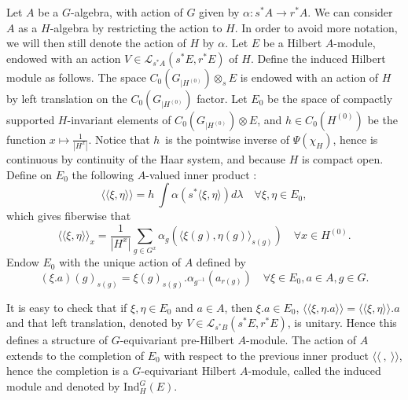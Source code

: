 Let $A$ be a $G$-algebra, with action of $G$ given by $\alpha : s^*A \rightarrow r^* A$. We can consider $A$ as a $H$-algebra by restricting the action to $H$. In order to avoid more notation, we will then still denote the action of $H$ by $\alpha$. Let $E$ be a Hilbert $A$-module, endowed with an action $V\in\mathcal L_{s^*A}(s^*E,r^*E)$ of $H$. Define the induced Hilbert module as follows. The space $C_0(G_{|H^{(0)}} )\otimes_s E$ is endowed with an action of $H$ by left translation on the $C_0(G_{|H^{(0)}})$ factor.  Let $E_0$ be the space of compactly supported $H$-invariant elements of $C_0(G_{|H^{(0)}})\otimes E$, and $h\in C_0(H^{(0)})$ be the function $x\mapsto \frac{1}{|H^x|}$. Notice that $h$\ is the pointwise inverse of $\Psi (\chi_H)$, hence is continuous by continuity of the Haar system, and because $H$ is compact open. Define on $E_0$ the following $A$-valued inner product :
\[\langle\langle \xi, \eta\rangle\rangle = h\ \int \alpha(s^*\langle \xi,\eta\rangle)d\lambda \quad \forall \xi,\eta\in E_0, \]
which gives fiberwise that 
\[\langle\langle \xi, \eta\rangle\rangle_x = \frac{1}{|H^x|}\sum_{g\in G^x} \alpha_g(\langle \xi (g),\eta (g)\rangle_{s(g)})\quad \forall x\in H^{(0)}.\]
Endow $E_0$ with the unique action of $A$ defined by 
\[(\xi .a)(g)_{s(g)} = \xi (g)_{s(g)}.\alpha_{g^{-1}}(a_{r(g)}) \quad \forall \xi \in E_0, a\in A,g\in G.\]


It is easy to check that if $\xi,\eta\in E_0$ and $a\in A$, then $\xi.a\in E_0$, $\langle\langle \xi,\eta.a \rangle\rangle= \langle\langle \xi,\eta \rangle\rangle . a$ and that left translation, denoted by $V\in\mathcal L_{s^* B}(s^* E, r^* E)$, is unitary. Hence this defines a structure of $G$-equivariant pre-Hilbert $A$-module. The action of $A$ extends to the completion of $E_0$ with respect to the previous inner product $\langle\langle \ , \ \rangle\rangle$, hence the completion is a $G$-equivariant Hilbert $A$-module, called the induced module and denoted by $\text{Ind}_H^G (E)$.\\  

